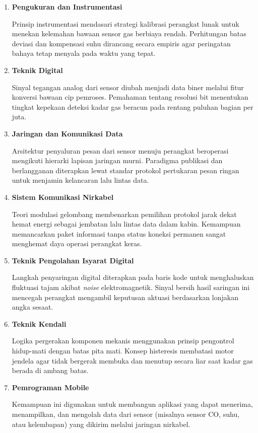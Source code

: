 \begin{enumerate}[label=\alph*.]
    \item \textbf{Pengukuran dan Instrumentasi}

    Prinsip instrumentasi mendasari strategi kalibrasi perangkat lunak untuk menekan kelemahan bawaan sensor gas berbiaya rendah. Perhitungan batas deviasi dan kompensasi suhu dirancang secara empiris agar peringatan bahaya tetap menyala pada waktu yang tepat.

    \item \textbf{Teknik Digital}

    Sinyal tegangan analog dari sensor diubah menjadi data biner melalui fitur konversi bawaan cip pemroses. Pemahaman tentang resolusi bit menentukan tingkat kepekaan deteksi kadar gas beracun pada rentang puluhan bagian per juta.

    \item \textbf{Jaringan dan Komunikasi Data}

    Arsitektur penyaluran pesan dari sensor menuju perangkat beroperasi mengikuti hierarki lapisan jaringan murni. Paradigma publikasi dan berlangganan diterapkan lewat standar protokol pertukaran pesan ringan untuk menjamin kelancaran lalu lintas data.

    \item \textbf{Sistem Komunikasi Nirkabel}

    Teori modulasi gelombang membenarkan pemilihan protokol jarak dekat hemat energi sebagai jembatan lalu lintas data dalam kabin. Kemampuan memancarkan paket informasi tanpa status koneksi permanen sangat menghemat daya operasi perangkat keras.

    \item \textbf{Teknik Pengolahan Isyarat Digital}

    Langkah penyaringan digital diterapkan pada baris kode untuk menghaluskan fluktuasi tajam akibat \textit{noise} elektromagnetik. Sinyal bersih hasil saringan ini mencegah perangkat mengambil keputusan aktuasi berdasarkan lonjakan angka sesaat.

    \item \textbf{Teknik Kendali}

    Logika pergerakan komponen mekanis menggunakan prinsip pengontrol hidup-mati dengan batas pita mati. Konsep histeresis membatasi motor jendela agar tidak bergerak membuka dan menutup secara liar saat kadar gas berada di ambang batas.

    \item \textbf{Pemrograman Mobile}

    Kemampuan ini digunakan untuk membangun aplikasi yang dapat menerima, menampilkan, dan mengolah data dari sensor (misalnya sensor CO, suhu, atau kelembapan) yang dikirim melalui jaringan nirkabel.


\end{enumerate}
